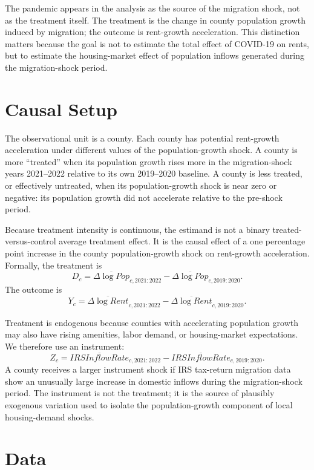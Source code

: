\documentclass[11pt]{article}
\begin{document}
The pandemic appears in the analysis as the source of the migration shock, not as the treatment itself. The treatment is the change in county population growth induced by migration; the outcome is rent-growth acceleration. This distinction matters because the goal is not to estimate the total effect of COVID-19 on rents, but to estimate the housing-market effect of population inflows generated during the migration-shock period.

\section{Causal Setup}

The observational unit is a county. Each county has potential rent-growth acceleration under different values of the population-growth shock. A county is more ``treated'' when its population growth rises more in the migration-shock years 2021--2022 relative to its own 2019--2020 baseline. A county is less treated, or effectively untreated, when its population-growth shock is near zero or negative: its population growth did not accelerate relative to the pre-shock period.

Because treatment intensity is continuous, the estimand is not a binary treated-versus-control average treatment effect. It is the causal effect of a one percentage point increase in the county population-growth shock on rent-growth acceleration. Formally, the treatment is
\[
D_c =
\overline{\Delta \log Pop}_{c,2021:2022}
-
\overline{\Delta \log Pop}_{c,2019:2020}.
\]
The outcome is
\[
Y_c =
\overline{\Delta \log Rent}_{c,2021:2022}
-
\overline{\Delta \log Rent}_{c,2019:2020}.
\]

Treatment is endogenous because counties with accelerating population growth may also have rising amenities, labor demand, or housing-market expectations. We therefore use an instrument:
\[
Z_c =
\overline{IRSInflowRate}_{c,2021:2022}
-
\overline{IRSInflowRate}_{c,2019:2020}.
\]
A county receives a larger instrument shock if IRS tax-return migration data show an unusually large increase in domestic inflows during the migration-shock period. The instrument is not the treatment; it is the source of plausibly exogenous variation used to isolate the population-growth component of local housing-demand shocks.

\section{Data}
\end{document}
